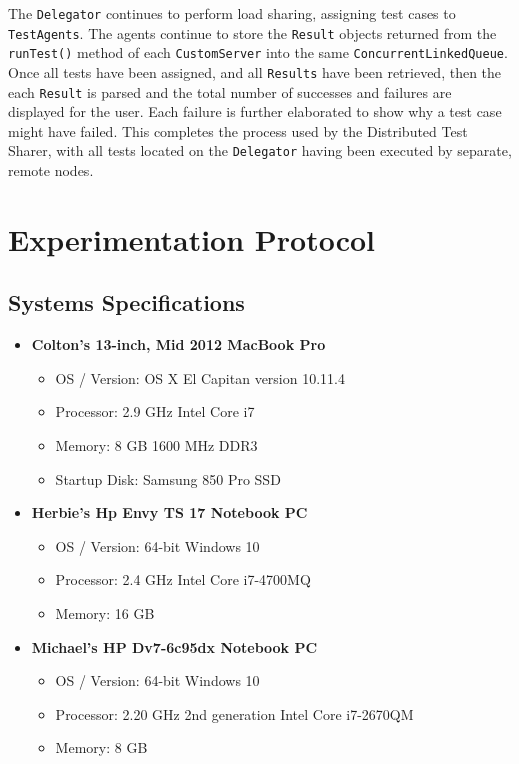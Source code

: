 \documentclass{article}
\begin{document}
{The \texttt{Delegator} continues to perform load sharing, assigning test cases to \texttt{TestAgents}.  The agents continue to store the \texttt{Result} objects returned from the \texttt{runTest()} method of each \texttt{CustomServer} into the same \texttt{ConcurrentLinkedQueue}.  Once all tests have been assigned, and all \texttt{Results} have been retrieved, then the each \texttt{Result} is parsed and the total number of successes and failures are displayed for the user.  Each failure is further elaborated to show why a test case might have failed.  This completes the process used by the Distributed Test Sharer, with all tests located on the \texttt{Delegator} having been executed by separate, remote nodes.

\section{Experimentation Protocol}
\label{experiments}

\subsection{Systems Specifications}
\label{specs}

\begin{itemize}
\item \textbf{Colton's 13-inch, Mid 2012 MacBook Pro}
\begin{itemize}
    \item OS / Version: OS X El Capitan version 10.11.4
    \item Processor: 2.9 GHz Intel Core i7
    \item Memory: 8 GB 1600 MHz DDR3
    \item Startup Disk: Samsung 850 Pro SSD
\end{itemize}

\item \textbf{Herbie's Hp Envy TS 17 Notebook PC}
\begin{itemize}
    \item OS / Version: 64-bit Windows 10
    \item Processor: 2.4 GHz Intel Core i7-4700MQ
    \item Memory: 16 GB
\end{itemize}

\item \textbf{Michael's HP Dv7-6c95dx Notebook PC}
\begin{itemize}
    \item OS / Version: 64-bit Windows 10
    \item Processor: 2.20 GHz 2nd generation Intel Core i7-2670QM
    \item Memory: 8 GB
\end{itemize}


\end{itemize}}
\end{document}
